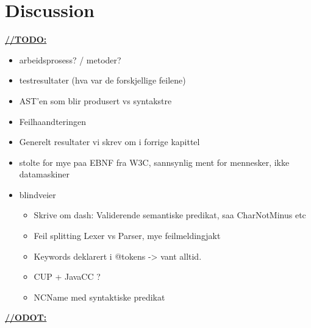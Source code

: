 \chapter{Discussion}

\underline{\textbf{\LARGE //TODO:}}

\begin{itemize}
\item arbeidsprosess? / metoder? 
\item testresultater (hva var de forskjellige feilene)
\item AST'en som blir produsert vs syntakstre
\item Feilhaandteringen
\item Generelt resultater vi skrev om i forrige kapittel
\item stolte for mye paa EBNF fra W3C, sannsynlig ment for mennesker, ikke datamaskiner
\item blindveier
	\begin{itemize}
	\item Skrive om dash: Validerende semantiske predikat, saa CharNotMinus etc
	\item Feil splitting Lexer vs Parser, mye feilmeldingjakt
	\item Keywords deklarert i @tokens -> vant alltid.
	\item CUP + JavaCC ?
	\item NCName med syntaktiske predikat
	\end{itemize}
\end{itemize}


\underline{\textbf{\LARGE //ODOT:}}

